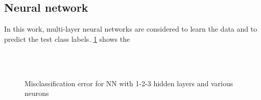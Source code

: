 \documentclass[letterpaper,12pt, onecolumn]{article}%
\begin{document}
\subsection{Neural network}
In this  work, multi-layer neural networks are considered to learn the data and to predict the test class labels. \cref{fig:errorNNHLS} shows the
\begin{figure}[!htb]
  \centering
  \\
  \\   
  \caption{Misclassification error for NN with 1-2-3 hidden layers and various neurons}
  \label{fig:errorNNHLS}
\end{figure}
\end{document}

